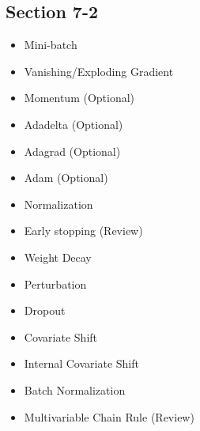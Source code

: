     \subsection*{Section 7-2}

    \begin{itemize}
        \item Mini-batch
        \item Vanishing/Exploding Gradient
        \item Momentum (Optional)
        \item Adadelta (Optional)
        \item Adagrad (Optional)
        \item Adam (Optional)
        \item Normalization
        \item Early stopping (Review)
        \item Weight Decay
        \item Perturbation
        \item Dropout
        \item Covariate Shift
        \item Internal Covariate Shift
        \item Batch Normalization
        \item Multivariable Chain Rule (Review)
    \end{itemize}
            

            
        
        
        
        
        



